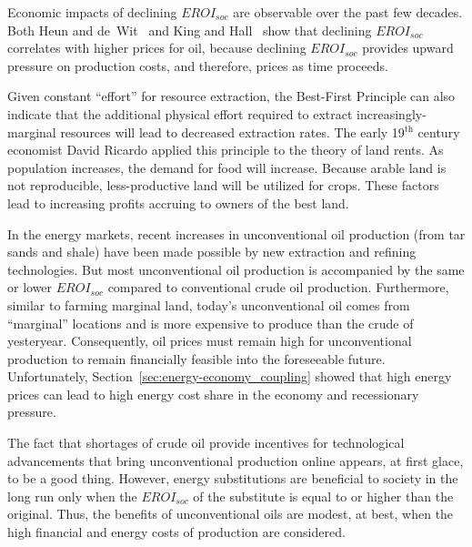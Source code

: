 Economic impacts of declining $EROI_{soc}$ 
are observable over the past few decades.
Both Heun and de~Wit~\cite{Heun:2012ek} and King and Hall~\cite{King:2011go}
show that declining $EROI_{soc}$ correlates with higher prices for oil, 
because declining $EROI_{soc}$ provides upward pressure on 
production costs, and therefore, prices
as time proceeds.

Given constant ``effort'' for resource extraction, 
the Best-First Principle
can also indicate that the additional physical effort required to extract
increasingly-marginal resources will lead to decreased extraction rates.
The early 19$^{\mathrm{th}}$ century economist David Ricardo applied this 
principle to the theory of land rents. 
As population increases, 
the demand for food will increase. 
Because arable land is not reproducible, 
less-productive land will be utilized for crops. 
These factors lead to increasing profits accruing to owners of the best land.

In the energy markets, recent increases in unconventional oil production
(from tar sands and shale)
have been made possible by new extraction and refining technologies.
But most unconventional oil production is accompanied 
by the same or lower $EROI_{soc}$
compared to conventional crude oil production. 
Furthermore, similar to farming marginal land, 
today's unconventional oil comes from ``marginal'' locations
and is more expensive to produce
than the crude of yesteryear.
Consequently, oil prices must remain high for 
unconventional production to remain financially feasible into the foreseeable future. 
Unfortunately, Section~\ref{sec:energy-economy_coupling} showed that
high energy prices can lead to high energy cost share in the economy
and recessionary pressure.

The fact that shortages of crude oil provide incentives for 
technological advancements that bring unconventional production online 
appears, at first glace, to be a good thing.
However, energy substitutions are beneficial to society 
in the long run only when the $EROI_{soc}$ of the substitute
is equal to or higher than the original.
Thus, the benefits of unconventional oils are modest, at best, when the
high financial and energy costs of production are considered.

